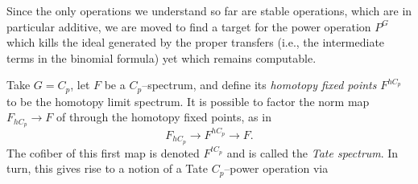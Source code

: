 Since the only operations we understand so far are stable operations, which are in particular additive, we are moved to find a target for the power operation \(P^G\) which kills the ideal generated by the proper transfers (i.e., the intermediate terms in the binomial formula) yet which remains computable.

\begin{definition}\label{DefnTateConstruction}
Take \(G = C_p\), let \(F\) be a \(C_p\)--spectrum, and define its \textit{homotopy fixed points} \(F^{hC_p}\) to be the homotopy limit spectrum.  It is possible to factor the norm map \(F_{hC_p} \to F\) of  through the homotopy fixed points, as in \[F_{hC_p} \to F^{hC_p} \to F.\]  The cofiber of this first map is denoted \(F^{tC_p}\) and is called the \textit{Tate spectrum}.  In turn, this gives rise to a notion of a Tate \(C_p\)--power operation via
\begin{center}
\end{center}
\end{definition}

